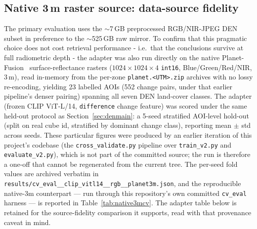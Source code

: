 \documentclass{article}
\begin{document}
\clearpage
{}
{}



\begin{appendices}

\clearpage
\section[Native 3 m raster source: data-source fidelity]{Native 3\,m raster source: data-source fidelity}
\label{sec:nativeraster}

The primary evaluation uses the $\sim$7\,GB preprocessed RGB/NIR-JPEG DEN subset
in preference to the $\sim$525\,GB raw mirror. To confirm that this pragmatic
choice does not cost retrieval performance - i.e.\ that the conclusions survive
at full radiometric depth - the adapter was also run directly on the native
Planet-Fusion~\cite{planetfusion} surface-reflectance rasters
($1024\times1024\times4$ \texttt{int16}, Blue/Green/Red/NIR, 3\,m), read in-memory
from the per-zone \texttt{planet.<UTM>.zip} archives with no lossy re-encoding,
yielding 23 labelled AOIs (552 change pairs, under that earlier pipeline's denser pairing) spanning all seven DEN
land-cover classes. The adapter (frozen CLIP ViT-L/14, \texttt{difference} change
feature) was scored under the same held-out protocol as
Section~\ref{sec:denmain}: a 5-seed stratified AOI-level hold-out (split on real
cube id, stratified by dominant change class), reporting mean $\pm$ std across
seeds. These particular figures were produced by an earlier iteration of this
project's codebase (the \texttt{cross\_validate.py} pipeline over
\texttt{train\_v2.py} and \texttt{evaluate\_v2.py}), which is not part of the
committed source; the run is therefore a one-off that cannot be regenerated from the
current tree. The per-seed fold values are archived verbatim in
\texttt{results/cv\_eval\_\_clip\_vitl14\_\_rgb\_\_planet3m.json}, and the
reproducible native-3m counterpart --- run through this repository's own committed
\texttt{cv\_eval} harness --- is reported in Table~\ref{tab:native3mcv}. The adapter
table below is retained for the source-fidelity comparison it supports, read with
that provenance caveat in mind.


\end{appendices}
\end{document}
